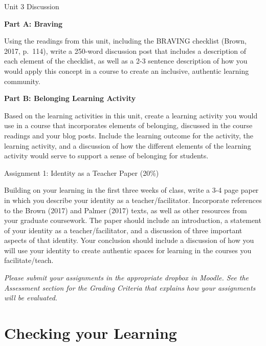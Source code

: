 \documentclass[
]{book}
\begin{document}
\begin{assessment}
{Unit 3 Discussion}

\textbf{Part A: Braving}

Using the readings from this unit, including the BRAVING checklist (Brown, 2017, p.~114), write a 250-word discussion post that includes a description of each element of the checklist, as well as a 2-3 sentence description of how you would apply this concept in a course to create an inclusive, authentic learning community.

\textbf{Part B: Belonging Learning Activity}

Based on the learning activities in this unit, create a learning activity you would use in a course that incorporates elements of belonging, discussed in the course readings and your blog posts. Include the learning outcome for the activity, the learning activity, and a discussion of how the different elements of the learning activity would serve to support a sense of belonging for students.
\end{assessment}

\begin{assessment}
{Assignment 1: Identity as a Teacher Paper (20\%)}

Building on your learning in the first three weeks of class, write a 3-4 page paper in which you describe your identity as a teacher/facilitator. Incorporate references to the Brown (2017) and Palmer (2017) texts, as well as other resources from your graduate coursework. The paper should include an introduction, a statement of your identity as a teacher/facilitator, and a discussion of three important aspects of that identity. Your conclusion should include a discussion of how you will use your identity to create authentic spaces for learning in the courses you facilitate/teach.
\end{assessment}

\begin{caution}
\emph{Please submit your assignments in the appropriate dropbox in Moodle. See the Assessment section for the Grading Criteria that explains how your assignments will be evaluated.}
\end{caution}

\hypertarget{checking-your-learning-2}{%
\section*{Checking your Learning}\label{checking-your-learning-2}}
\end{document}

